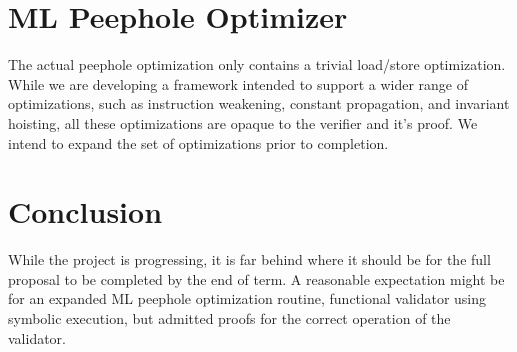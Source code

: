 \documentclass{article}
\begin{document}
\section{ML Peephole Optimizer}
The actual peephole optimization only contains a trivial load/store
optimization.  While we are developing a framework intended to support
a wider range of optimizations, such as instruction weakening,
constant propagation, and invariant hoisting, all these optimizations
are opaque to the verifier and it's proof.  We intend to expand the
set of optimizations prior to completion.

\section{Conclusion}
While the project is progressing, it is far behind where it should be
for the full proposal to be completed by the end of term.  A
reasonable expectation might be for an expanded ML peephole
optimization routine, functional validator using symbolic execution,
but admitted proofs for the correct operation of the validator.
\end{document}
